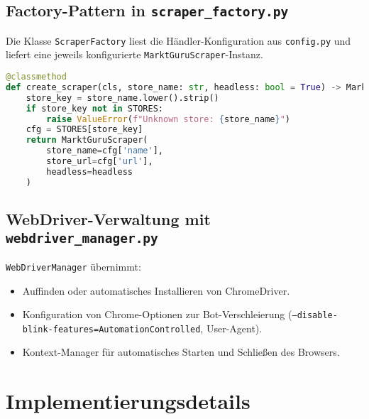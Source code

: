 \subsection{Factory-Pattern in \texttt{scraper\_factory.py}}
Die Klasse \texttt{ScraperFactory} liest die Händler-Konfiguration aus \texttt{config.py} und liefert eine jeweils konfigurierte \texttt{MarktGuruScraper}-Instanz.

\begin{lstlisting}[language=Python, caption={Schlüsselmethode in \texttt{scraper\_factory.py}}]
@classmethod
def create_scraper(cls, store_name: str, headless: bool = True) -> MarktGuruScraper:
    store_key = store_name.lower().strip()
    if store_key not in STORES:
        raise ValueError(f"Unknown store: {store_name}")
    cfg = STORES[store_key]
    return MarktGuruScraper(
        store_name=cfg['name'],
        store_url=cfg['url'],
        headless=headless
    )
\end{lstlisting}

\subsection{WebDriver-Verwaltung mit \texttt{webdriver\_manager.py}}
\texttt{WebDriverManager} übernimmt:
\begin{itemize}
  \item Auffinden oder automatisches Installieren von ChromeDriver.  
  \item Konfiguration von Chrome-Optionen zur Bot-Verschleierung (\texttt{--disable-blink-features=AutomationControlled}, User-Agent).  
  \item Kontext-Manager für automatisches Starten und Schließen des Browsers.  
\end{itemize}

\section{Implementierungsdetails}
